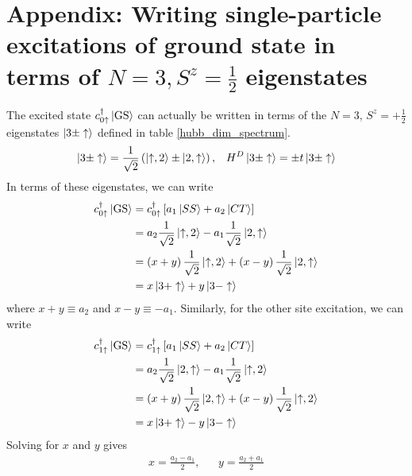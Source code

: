 \documentclass{article}
\numberwithin{equation}{section}
\begin{document}
\section{Appendix: Writing single-particle excitations of ground state in terms of $N=3, S^z = \frac{1}{2}$ eigenstates}
The excited state $c^\dagger_{0\uparrow}\ket{\text{GS}}$ can actually be written in terms of the $N=3$, $S^z = + \frac{1}{2}$ eigenstates $\ket{3\pm\uparrow}$ defined in table \ref{hubb_dim_spectrum}.
\begin{equation}\begin{aligned}
	\ket{3\pm \uparrow} = \frac{1}{\sqrt 2}\left(\ket{\uparrow, 2} \pm \ket{2, \uparrow}\right), && H^D \ket{3\pm \uparrow} = \pm t\ket{3\pm \uparrow}
\end{aligned}\end{equation}
In terms of these eigenstates, we can write
\begin{equation}\begin{aligned}
	c^\dagger_{0\uparrow}\ket{\text{GS}} 
	&= c^\dagger_{0\uparrow}\left[a_1 \ket{SS} + a_2 \ket{CT}\right] \\
	&= a_2 \frac{1}{\sqrt 2}\ket{\uparrow,2} - a_1 \frac{1}{\sqrt 2}\ket{2, \uparrow}\\
	&= \left(x + y\right) \frac{1}{\sqrt 2}\ket{\uparrow,2} + \left(x - y\right) \frac{1}{\sqrt 2}\ket{2, \uparrow}\\
	&=x\ket{3+ \uparrow} + y\ket{3- \uparrow}
\end{aligned}\end{equation}
where $x + y \equiv a_2$ and $x-y \equiv -a_1$. Similarly, for the other site excitation, we can write
\begin{equation}\begin{aligned}
	c^\dagger_{1\uparrow}\ket{\text{GS}} 
	&= c^\dagger_{1\uparrow}\left[a_1 \ket{SS} + a_2 \ket{CT}\right] \\
	&= a_2 \frac{1}{\sqrt 2}\ket{2, \uparrow} - a_1 \frac{1}{\sqrt 2}\ket{\uparrow, 2}\\
	&=  \left(x + y\right) \frac{1}{\sqrt 2}\ket{2, \uparrow} + \left(x - y\right) \frac{1}{\sqrt 2}\ket{\uparrow, 2}\\
	&=x\ket{3+ \uparrow} - y\ket{3- \uparrow}
\end{aligned}\end{equation}
Solving for $x$ and $y$ gives
\begin{equation}\begin{aligned}
	x = \frac{a_2 - a_1}{2}, && y = \frac{a_2 + a_1}{2}
\end{aligned}\end{equation}
\end{document}

